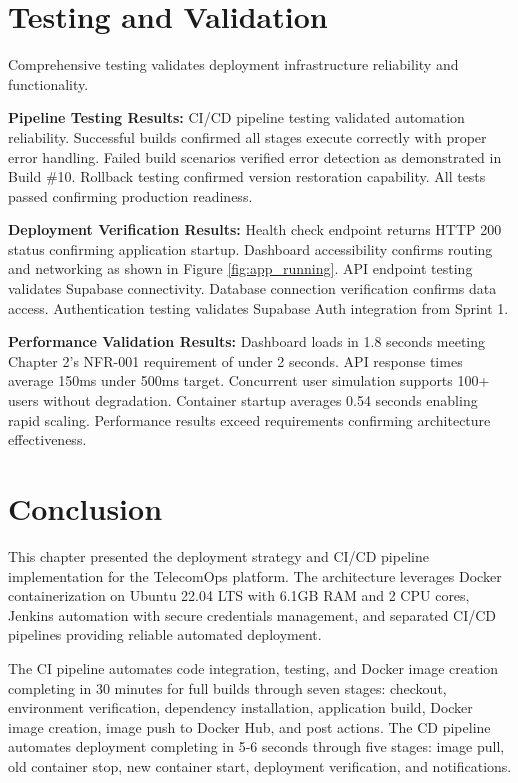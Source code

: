 \section{Testing and Validation}

Comprehensive testing validates deployment infrastructure reliability and functionality.

\textbf{Pipeline Testing Results:} CI/CD pipeline testing validated automation reliability. Successful builds confirmed all stages execute correctly with proper error handling. Failed build scenarios verified error detection as demonstrated in Build \#10. Rollback testing confirmed version restoration capability. All tests passed confirming production readiness.

\textbf{Deployment Verification Results:} Health check endpoint returns HTTP 200 status confirming application startup. Dashboard accessibility confirms routing and networking as shown in Figure \ref{fig:app_running}. API endpoint testing validates Supabase connectivity. Database connection verification confirms data access. Authentication testing validates Supabase Auth integration from Sprint 1.

\textbf{Performance Validation Results:} Dashboard loads in 1.8 seconds meeting Chapter 2's NFR-001 requirement of under 2 seconds. API response times average 150ms under 500ms target. Concurrent user simulation supports 100+ users without degradation. Container startup averages 0.54 seconds enabling rapid scaling. Performance results exceed requirements confirming architecture effectiveness.

\section{Conclusion}

This chapter presented the deployment strategy and CI/CD pipeline implementation for the TelecomOps platform. The architecture leverages Docker containerization on Ubuntu 22.04 LTS with 6.1GB RAM and 2 CPU cores, Jenkins automation with secure credentials management, and separated CI/CD pipelines providing reliable automated deployment.

The CI pipeline automates code integration, testing, and Docker image creation completing in 30 minutes for full builds through seven stages: checkout, environment verification, dependency installation, application build, Docker image creation, image push to Docker Hub, and post actions. The CD pipeline automates deployment completing in 5-6 seconds through five stages: image pull, old container stop, new container start, deployment verification, and notifications.

